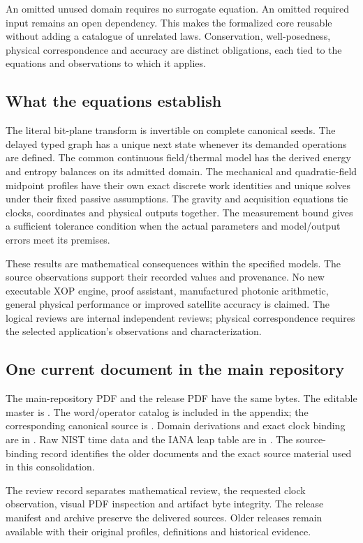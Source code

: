 An omitted unused domain requires no surrogate equation. An omitted required
input remains an open dependency. This makes the formalized core reusable
without adding a catalogue of unrelated laws. Conservation, well-posedness,
physical correspondence and accuracy are distinct obligations, each tied to
the equations and observations to which it applies.

\subsection{What the equations establish}
The literal bit-plane transform is invertible on complete canonical seeds.
The delayed typed graph has a unique next state whenever its demanded
operations are defined. The common continuous field/thermal model has the
derived energy and entropy balances on its admitted domain. The mechanical
and quadratic-field midpoint profiles have their own exact discrete work
identities and unique solves under their fixed passive assumptions. The
gravity and acquisition equations tie clocks, coordinates and physical
outputs together. The measurement bound gives a sufficient tolerance
condition when the actual parameters and model/output errors meet its premises.

These results are mathematical consequences within the specified models.
The source observations support their recorded values and provenance. No
new executable XOP engine, proof assistant, manufactured photonic arithmetic,
general physical performance or improved satellite accuracy is claimed.
The logical reviews are internal independent reviews; physical correspondence
requires the selected application's observations and characterization.

\subsection{One current document in the main repository}
The main-repository PDF and the release PDF have the same bytes. The editable
master is . The word/operator catalog is included in
the appendix; the corresponding canonical source is
. Domain derivations and exact clock binding
are in . Raw NIST time data and the IANA leap table are in
. The source-binding record identifies the older
documents and the exact source material used in this consolidation.

The review record separates mathematical review, the requested clock
observation, visual PDF inspection and artifact byte integrity. The release
manifest and archive preserve the delivered sources. Older releases remain
available with their original profiles, definitions and historical evidence.
